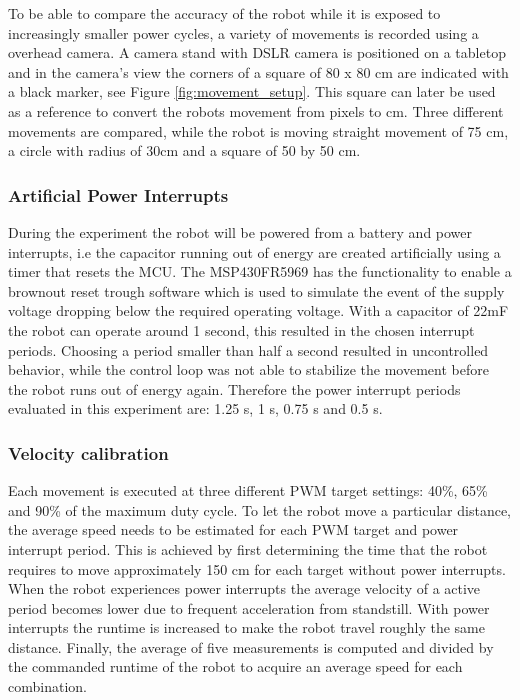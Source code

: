 To be able to compare the accuracy of the robot while it is exposed to increasingly smaller power cycles, a variety of movements is recorded using a overhead camera.
A camera stand with DSLR camera is positioned on a tabletop and in the camera's view the corners of a square of 80 x 80 cm are indicated with a black marker, see Figure \ref{fig:movement_setup}.
This square can later be used as a reference to convert the robots movement from pixels to cm.
Three different movements are compared, while the robot is moving straight movement of 75 cm, a circle with radius of 30cm and a square of 50 by 50 cm.

\subsubsection{Artificial Power Interrupts}

During the experiment the robot will be powered from a battery and power interrupts, i.e the capacitor running out of energy are created artificially using a timer that resets the MCU.
The MSP430FR5969 has the functionality to enable a brownout reset trough software which is used to simulate the event of the supply voltage dropping below the required operating voltage.
With a capacitor of 22mF the robot can operate around 1 second, this resulted in the chosen interrupt periods.
Choosing a period smaller than half a second resulted in uncontrolled behavior, while the control loop was not able to stabilize the movement before the robot runs out of energy again.
Therefore the power interrupt periods evaluated in this experiment are: 1.25 s, 1 s, 0.75 s and 0.5 s.

\subsubsection{Velocity calibration}

Each movement is executed at three different PWM target settings: 40\%, 65\% and 90\% of the maximum duty cycle.
To let the robot move a particular distance, the average speed needs to be estimated for each PWM target and power interrupt period.
This is achieved by first determining the time that the robot requires to move approximately 150 cm for each target without power interrupts.
When the robot experiences power interrupts the average velocity of a active period becomes lower due to frequent acceleration from standstill.
With power interrupts the runtime is increased to make the robot travel roughly the same distance.
Finally, the average of five measurements is computed and divided by the commanded runtime of the robot to acquire an average speed for each combination.


